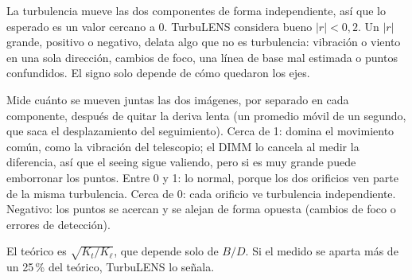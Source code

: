 \begin{description}[style=nextline,leftmargin=1.2em,font=\bfseries\color{acentoosc}]
\item[$r$ longitudinal–transversal]
La turbulencia mueve las dos componentes de forma independiente, así que lo esperado es un valor cercano a 0. TurbuLENS
considera bueno $|r| < 0{,}2$. Un $|r|$ grande, positivo o negativo, delata algo que no es turbulencia: vibración o viento
en una sola dirección, cambios de foco, una línea de base mal estimada o puntos confundidos. El signo solo depende de cómo
quedaron los ejes.
\item[$r$ entre los dos puntos]
Mide cuánto se mueven juntas las dos imágenes, por separado en cada componente, después de quitar la deriva lenta (un
promedio móvil de un segundo, que saca el desplazamiento del seguimiento). Cerca de 1: domina el movimiento común, como
la vibración del telescopio; el DIMM lo cancela al medir la diferencia, así que el seeing sigue valiendo, pero si es muy
grande puede emborronar los puntos. Entre 0 y 1: lo normal, porque los dos orificios ven parte de la misma turbulencia.
Cerca de 0: cada orificio ve turbulencia independiente. Negativo: los puntos se acercan y se alejan de forma opuesta
(cambios de foco o errores de detección).
\item[$\sigma_t/\sigma_\ell$ medido frente al teórico]
El teórico es $\sqrt{K_t/K_\ell}$, que depende solo de $B/D$. Si el medido se aparta más de un 25\,\% del teórico,
TurbuLENS lo señala.
\end{description}

\begin{center}
\end{center}

